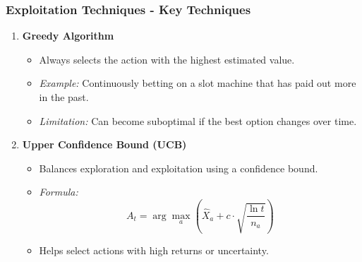 \documentclass[aspectratio=169]{beamer}
\begin{document}
\begin{frame}[fragile]
    \frametitle{Exploitation Techniques - Key Techniques}
    \begin{enumerate}
        \item \textbf{Greedy Algorithm}
            \begin{itemize}
                \item Always selects the action with the highest estimated value.
                \item \textit{Example:} Continuously betting on a slot machine that has paid out more in the past.
                \item \textit{Limitation:} Can become suboptimal if the best option changes over time.
            \end{itemize}

        \item \textbf{Upper Confidence Bound (UCB)}
            \begin{itemize}
                \item Balances exploration and exploitation using a confidence bound.
                \item \textit{Formula:}
                \begin{equation}
                A_t = \arg\max_a \left(\hat{X}_a + c \cdot \sqrt{\frac{\ln t}{n_a}}\right)
                \end{equation}
                \item Helps select actions with high returns or uncertainty.
            \end{itemize}
    \end{enumerate}
\end{frame}
\end{document}
